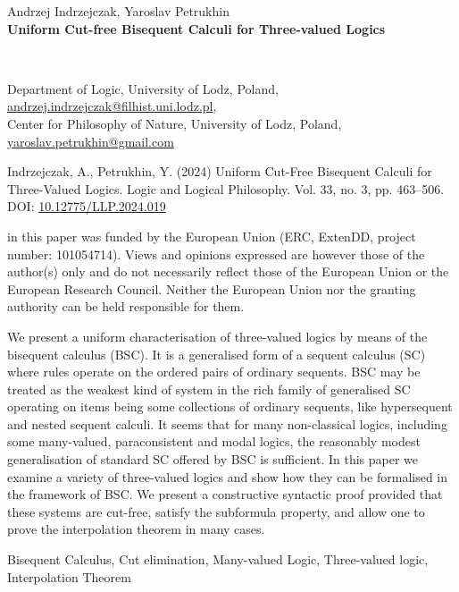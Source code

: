 \documentclass[11pt,a4paper,titlepage]{article}
\theoremstyle{definition}
\newcommand{\3}{\vspace{.3in}}
\newcommand{\2}{\vspace{.2in}}
\newcommand{\1}{\vspace{.1in}}
\newcommand{\5}{\vspace{.05in}}
\newcommand\DOI[2]{DOI: \href{#1#2}{#2}}
\newenvironment{Published}{\begin{list}{}{\leftmargin=25pt}
    \item[]\small\noindent{Published as}}%
    {\end{list}}
\newenvironment{Funding}{\begin{list}{}{\leftmargin=25pt}
        \item[]\small\noindent{The research}}%
        {\end{list}}
\newenvironment{Abstract}{\begin{list}{}{\leftmargin=25pt}
    \item[]\footnotesize\noindent{\sc \bf Abstract:}}%
{\end{list}}
\newenvironment{keywords}{\begin{list}{}{\leftmargin=25pt}
    \item[]\footnotesize\noindent{\sc \bf Keywords:}}%
{\end{list}}
\begin{document}
\begin{center}
\vspace{0.3cm}
{\large Andrzej Indrzejczak, 
Yaroslav Petrukhin\vspace{0.3cm}\\
\textbf{Uniform Cut-free Bisequent Calculi for Three-valued Logics}}

\ \\
\begin{footnotesize}
\noindent Department of Logic, University of Lodz, Poland,  \url{andrzej.indrzejczak@filhist.uni.lodz.pl},\\
\noindent Center for Philosophy of Nature, University of Lodz, Poland,  \url{yaroslav.petrukhin@gmail.com}\\
\end{footnotesize}
\end{center}
\begin{Published}
 Indrzejczak, A., Petrukhin, Y. (2024)
Uniform Cut-Free Bisequent Calculi for Three-Valued Logics. Logic and Logical Philosophy. Vol. 33, no. 3, pp. 463--506. 
\DOI{http://dx.doi.org/}{10.12775/LLP.2024.019}
\bigskip
\end{Published}
\begin{Funding}
in this paper was funded by the European Union
 (ERC, ExtenDD, project number: 101054714). Views and opinions expressed
 are however those of the author(s) only and do not necessarily reflect those of
 the European Union or the European Research Council. Neither the European
 Union nor the granting authority can be held responsible for them.
\end{Funding}
 \begin{Abstract}
We present a uniform characterisation of three-valued logics by means of the bisequent calculus (BSC). It is a generalised form of a sequent calculus (SC) where rules operate on the ordered pairs of ordinary sequents. BSC may be treated as the weakest kind of system in the rich family of generalised SC operating on items being some collections of ordinary sequents, like hypersequent and nested sequent calculi. It seems that for many non-classical logics, including some many-valued, paraconsistent and modal logics, the reasonably modest generalisation of standard SC offered by BSC is sufficient. In this paper we examine a variety of three-valued logics and show how they can be formalised in the framework of BSC. We present a constructive syntactic proof provided that these systems are cut-free, satisfy the subformula property, and allow one to prove the interpolation theorem in many cases.
 \end{Abstract}
 \begin{keywords}
Bisequent Calculus, Cut elimination, Many-valued Logic, Three-valued logic, Interpolation Theorem
 \end{keywords}
\end{document}
